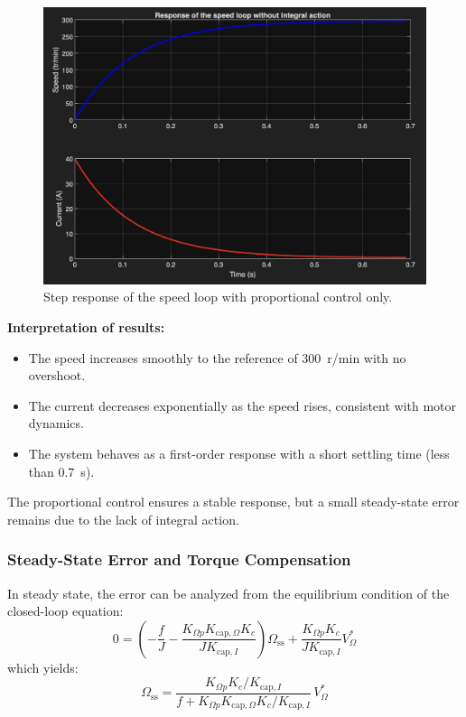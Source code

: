 \documentclass{rapportCS}
\begin{document}
\begin{figure}[H]
    \centering
    \includegraphics[width=0.85\linewidth]{figures/speedloop.png}
    \caption{Step response of the speed loop with proportional control only.}
    \label{fig:speedloop_no_integral}
\end{figure}

\noindent\textbf{Interpretation of results:}
\begin{itemize}
    \item The speed increases smoothly to the reference of 300~r/min with no overshoot.
    \item The current decreases exponentially as the speed rises, consistent with motor dynamics.
    \item The system behaves as a first-order response with a short settling time (less than 0.7~s).
\end{itemize}

The proportional control ensures a stable response, but a small steady-state error remains due to the lack of integral action.
\subsubsection{Steady-State Error and Torque Compensation}

In steady state, the error can be analyzed from the equilibrium condition of the closed-loop equation:
\[
0 = 
\left(-\frac{f}{J} - \frac{K_{\Omega p}K_{\mathrm{cap},\Omega}K_c}{J K_{\mathrm{cap},I}}\right)\Omega_{\mathrm{ss}}
+ \frac{K_{\Omega p} K_c}{J K_{\mathrm{cap},I}} V_{\Omega}^*
\]
which yields:
\[
\Omega_{\mathrm{ss}} =
\frac{K_{\Omega p} K_c / K_{\mathrm{cap},I}}{f + K_{\Omega p} K_{\mathrm{cap},\Omega} K_c / K_{\mathrm{cap},I}} \, V_{\Omega}^*
\]
\end{document}

